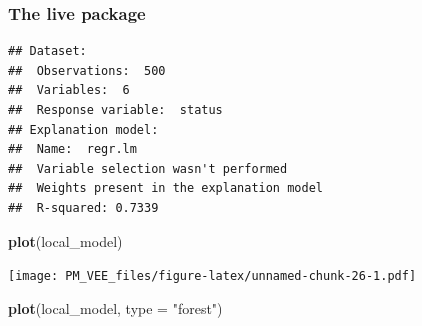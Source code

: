 \documentclass[]{krantz}
\newenvironment{Shaded}{\begin{snugshade}}{\end{snugshade}}
\newcommand{\ControlFlowTok}[1]{\textcolor[rgb]{0.13,0.29,0.53}{\textbf{#1}}}
\newcommand{\DataTypeTok}[1]{\textcolor[rgb]{0.13,0.29,0.53}{#1}}
\newcommand{\DecValTok}[1]{\textcolor[rgb]{0.00,0.00,0.81}{#1}}
\newcommand{\KeywordTok}[1]{\textcolor[rgb]{0.13,0.29,0.53}{\textbf{#1}}}
\newcommand{\NormalTok}[1]{#1}
\newcommand{\OperatorTok}[1]{\textcolor[rgb]{0.81,0.36,0.00}{\textbf{#1}}}
\newcommand{\StringTok}[1]{\textcolor[rgb]{0.31,0.60,0.02}{#1}}
\theoremstyle{definition}
\theoremstyle{definition}
\theoremstyle{definition}
\theoremstyle{remark}
\begin{document}
\hypertarget{the-live-package}{%
\subsubsection{\texorpdfstring{\textbf{The live
package}}{The live package}}\label{the-live-package}}

\begin{Shaded}
\end{Shaded}

\begin{verbatim}
## Dataset: 
##  Observations:  500 
##  Variables:  6 
##  Response variable:  status 
## Explanation model: 
##  Name:  regr.lm 
##  Variable selection wasn't performed 
##  Weights present in the explanation model 
##  R-squared: 0.7339
\end{verbatim}

\begin{Shaded}
\begin{Highlighting}[]
\KeywordTok{plot}\NormalTok{(local_model)}
\end{Highlighting}
\end{Shaded}

\texttt{[image: PM\_VEE\_files/figure-latex/unnamed-chunk-26-1.pdf]}

\begin{Shaded}
\begin{Highlighting}[]
\KeywordTok{plot}\NormalTok{(local_model, }\DataTypeTok{type =} \StringTok{"forest"}\NormalTok{)}
\end{Highlighting}
\end{Shaded}
\end{document}
